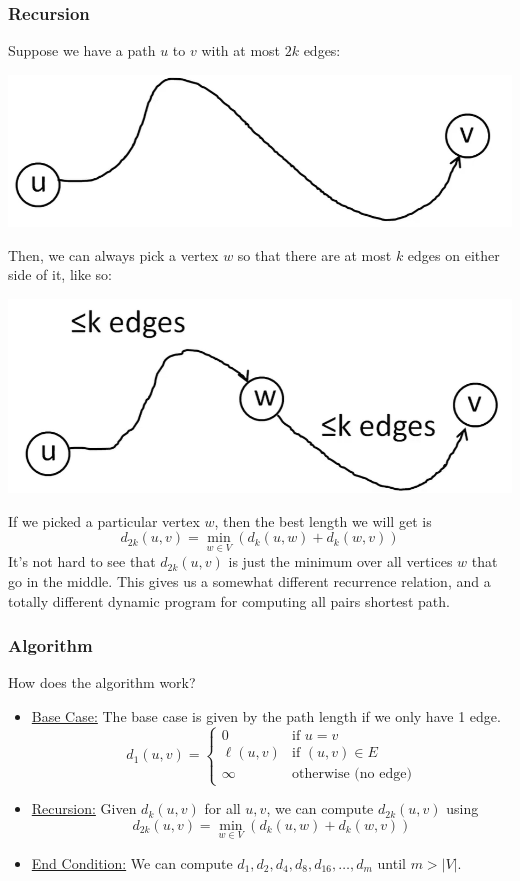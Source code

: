 \documentclass[letterpaper]{article}
\begin{document}
\subsubsection{Recursion}
Suppose we have a path $u$ to $v$ with at most $2k$ edges: 
\begin{center}
    \includegraphics[scale=0.5]{assets/sp_2.png}
\end{center}
Then, we can always pick a vertex $w$ so that there are at most $k$ edges on either side of it, like so: 
\begin{center}
    \includegraphics[scale=0.5]{assets/sp_3.png}
\end{center}
If we picked a particular vertex $w$, then the best length we will get is 
\[d_{2k}(u, v) = \min_{w \in V} (d_{k}(u, w) + d_{k}(w, v))\]
It's not hard to see that $d_{2k}(u, v)$ is just the minimum over all vertices $w$ that go in the middle. This gives us a somewhat different recurrence relation, and a totally different dynamic program for computing all pairs shortest path. 


\subsubsection{Algorithm}
How does the algorithm work? 

\begin{itemize}
    \item \underline{Base Case:} The base case is given by the path length if we only have 1 edge. 
    \[d_{1}(u, v) = \begin{cases}
        0 & \text{if } u = v \\ 
        \ell(u, v) & \text{if } (u, v) \in E \\ 
        \infty & \text{otherwise (no edge)} 
    \end{cases}\]

    \item \underline{Recursion:} Given $d_{k}(u, v)$ for all $u, v$, we can compute $d_{2k}(u, v)$ using 
    \[d_{2k}(u, v) = \min_{w \in V} (d_{k}(u, w) + d_{k}(w, v))\]

    \item \underline{End Condition:} We can compute $d_1, d_2, d_4, d_8, d_{16}, \dots, d_m$ until $m > |V|$. 
\end{itemize}
\end{document}
